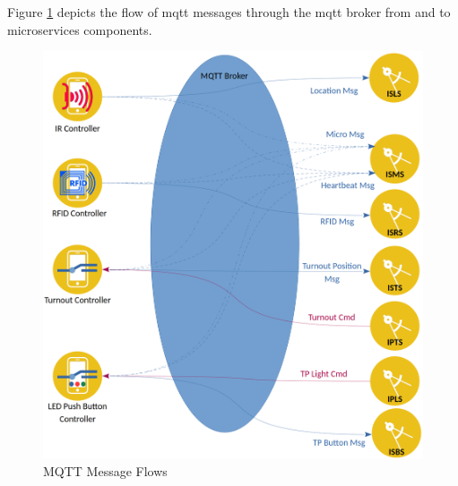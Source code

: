 Figure \ref{fig:iotdesign} depicts the flow of \gls{mqtt} messages through the \gls{mqtt} broker from and to microservices components.

\begin{figure}[H]
	\centering
		\includegraphics[scale=0.18]{../Images/mqtt-flow.png}
	\caption{MQTT Message Flows}
	\label{fig:iotdesign}
\end{figure}

